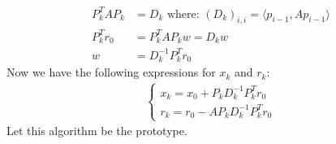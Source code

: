 \documentclass[]{article}
\theoremstyle{definition}
\begin{document}
            \begin{align}
                P^T_kAP_k &= D_k \text{ where: } (D_k)_{i,i} = \langle p_{i - 1}, Ap_{i - 1}\rangle
                \\
                P_k^T r_0 &= P^T_kAP_kw = D_kw
                \\
                w &= D^{-1}_kP_k^Tr_0
            \end{align}
           Now we have the following expressions for $x_k$ and $r_k$:
            \begin{align}
                \begin{cases}
                    x_k = x_0 + P_kD^{-1}_kP^T_kr_0
                    \\
                    r_k = r_0 - AP_kD^{-1}_kP^T_k r_0
                \end{cases}
            \end{align}
            Let this algorithm be the prototype. 
\end{document}
